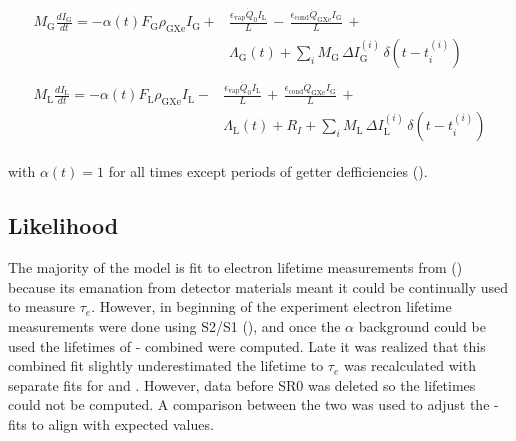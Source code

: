 \begin{subequations}
\begin{align}
\begin{split}
M_{\mathrm{G}} \frac{dI_{\mathrm{G}}}{dt} = - \alpha (t) F_{\mathrm{G}} \rho_{\mathrm{GXe}} I_{\mathrm{G}} +
& \frac{\epsilon_{\mathrm{vap}} \dot{Q}_0 I_{\mathrm{L}}}{L}\, - \,
\frac{\epsilon_{\mathrm{cond}} \dot{Q}_{\mathrm{GXe}} I_{\mathrm{G}}}{L}\, + \\
& \Lambda_{\mathrm{G}}(t) + \sum_i  M_{\mathrm{G}}\, \Delta I_{\mathrm{G}}^{(i)}\, \delta (t - t_i^{(i)})
\end{split}
\\
\begin{split}
M_{\mathrm{L}} \frac{dI_{\mathrm{L}}}{dt} = -\alpha (t) F_{\mathrm{L}} \rho_{\mathrm{GXe}} I_{\mathrm{L}} -
& \frac{\epsilon_{\mathrm{vap}} \dot{Q}_0 I_{\mathrm{L}}}{L}\, + \,
\frac{\epsilon_{\mathrm{cond}} \dot{Q}_{\mathrm{GXe}} I_{\mathrm{G}}}{L}\, + \\
& \Lambda_{\mathrm{L}}(t) + R_I + \sum_i  M_{\mathrm{L}}\, \Delta I_{\mathrm{L}}^{(i)}\, \delta (t - t_i^{(i)})
\end{split}
\end{align}
\end{subequations}

\noindent with $\alpha(t) = 1$ for all times except periods of getter defficiencies
().



\subsection{Likelihood}
\label{subsec:elifetime_fit_likelihood}
The majority of the model is fit to electron lifetime measurements from 
() because its emanation from
detector materials meant it could be continually used to measure $\tau_e$.  However, in beginning of the
experiment electron lifetime measurements were done using S2/S1 (), and once the $\alpha$
background could be used the lifetimes of - combined were computed.  Late it was realized that this combined
fit slightly underestimated the lifetime to $\tau_e$ was recalculated with separate fits for  and .  However,
data before SR0 was deleted so the lifetimes could not be computed.  A comparison between the two was used to adjust the
- fits to align with expected values.

